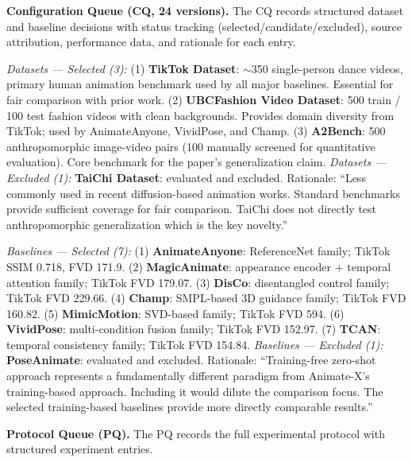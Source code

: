 \begin{tcolorbox}[
	title={Box 18: Case 3 --- OptED Framework Output (Configuration Queue + Protocol Queue Highlights)},
	colback=green!3!white,
	colframe=green!30!black,
	colbacktitle=green!15!white,
	coltitle=black,
	fonttitle=\bfseries,
	arc=3mm,
	boxrule=0.8pt,
	breakable
]
\small
\textbf{Configuration Queue (CQ, 24 versions).} The CQ records structured dataset and baseline decisions with status tracking (selected/candidate/excluded), source attribution, performance data, and rationale for each entry.

\smallskip
\textit{Datasets --- Selected (3):} (1) \textbf{TikTok Dataset}: $\sim$350 single-person dance videos, primary human animation benchmark used by all major baselines. Essential for fair comparison with prior work. (2) \textbf{UBCFashion Video Dataset}: 500 train / 100 test fashion videos with clean backgrounds. Provides domain diversity from TikTok; used by AnimateAnyone, VividPose, and Champ. (3) \textbf{A2Bench}: 500 anthropomorphic image-video pairs (100 manually screened for quantitative evaluation). Core benchmark for the paper's generalization claim. \textit{Datasets --- Excluded (1):} \textbf{TaiChi Dataset}: evaluated and excluded. Rationale: ``Less commonly used in recent diffusion-based animation works. Standard benchmarks provide sufficient coverage for fair comparison. TaiChi does not directly test anthropomorphic generalization which is the key novelty.''

\smallskip
\textit{Baselines --- Selected (7):} (1) \textbf{AnimateAnyone}: ReferenceNet family; TikTok SSIM 0.718, FVD 171.9. (2) \textbf{MagicAnimate}: appearance encoder + temporal attention family; TikTok FVD 179.07. (3) \textbf{DisCo}: disentangled control family; TikTok FVD 229.66. (4) \textbf{Champ}: SMPL-based 3D guidance family; TikTok FVD 160.82. (5) \textbf{MimicMotion}: SVD-based family; TikTok FVD 594. (6) \textbf{VividPose}: multi-condition fusion family; TikTok FVD 152.97. (7) \textbf{TCAN}: temporal consistency family; TikTok FVD 154.84. \textit{Baselines --- Excluded (1):} \textbf{PoseAnimate}: evaluated and excluded. Rationale: ``Training-free zero-shot approach represents a fundamentally different paradigm from Animate-X's training-based approach. Including it would dilute the comparison focus. The selected training-based baselines provide more directly comparable results.''

\smallskip
\textbf{Protocol Queue (PQ).} The PQ records the full experimental protocol with structured experiment entries.


\end{tcolorbox}

